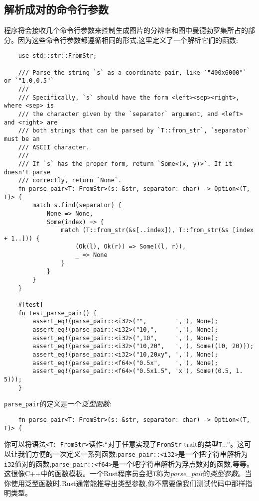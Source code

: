 \subsection{解析成对的命令行参数}
程序将会接收几个命令行参数来控制生成图片的分辨率和图中曼德勃罗集所占的部分。因为这些命令行参数都遵循相同的形式,这里定义了一个解析它们的函数:
\begin{verbatim}
    use std::str::FromStr;

    /// Parse the string `s` as a coordinate pair, like `"400x6000"` or `"1.0,0.5"`
    ///
    /// Specifically, `s` should have the form <left><sep><right>, where <sep> is
    /// the character given by the `separator` argument, and <left> and <right> are
    /// both strings that can be parsed by `T::from_str`, `separator` must be an
    /// ASCII character.
    ///
    /// If `s` has the proper form, return `Some<(x, y)>`. If it doesn't parse
    /// correctly, return `None`.
    fn parse_pair<T: FromStr>(s: &str, separator: char) -> Option<(T, T)> {
        match s.find(separator) {
            None => None,
            Some(index) => {
                match (T::from_str(&s[..index]), T::from_str(&s [index + 1..])) {
                    (Ok(l), Ok(r)) => Some((l, r)),
                    _ => None
                }
            }
        }
    }

    #[test]
    fn test_parse_pair() {
        assert_eq!(parse_pair::<i32>("",        ','), None);
        assert_eq!(parse_pair::<i32>("10,",     ','), None);
        assert_eq!(parse_pair::<i32>(",10",     ','), None);
        assert_eq!(parse_pair::<i32>("10,20",   ','), Some((10, 20)));
        assert_eq!(parse_pair::<i32>("10,20xy", ','), None);
        assert_eq!(parse_pair::<f64>("0.5x",    ','), None);
        assert_eq!(parse_pair::<f64>("0.5x1.5", 'x'), Some((0.5, 1. 5)));
    }
\end{verbatim}

\texttt{parse\_pair}的定义是一个\emph{泛型函数}:
\begin{verbatim}
    fn parse_pair<T: FromStr>(s: &str, separator: char) -> Option<(T, T)> {
\end{verbatim}

你可以将语法\texttt{<T: FromStr>}读作:“对于任意实现了\texttt{FromStr} trait的类型\texttt{T}...”。这可以让我们方便的一次定义一系列函数:\texttt{parse\_pair::<i32>}是一个把字符串解析为\texttt{i32}值对的函数,\texttt{parse\_pair::<f64>}是一个吧字符串解析为浮点数对的函数,等等。这很像C++中的函数模板。一个Rust程序员会把\texttt{T}称为\emph{parse\_pair}的\emph{类型参数}。当你使用泛型函数时,Rust通常能推导出类型参数,你不需要像我们测试代码中那样指明类型。


